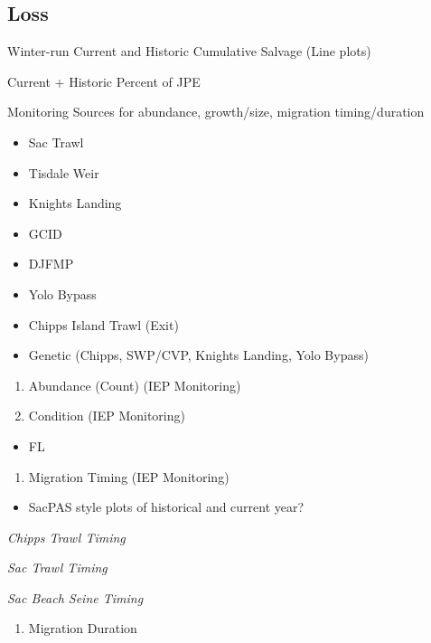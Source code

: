 \documentclass[
]{book}
\providecommand{\tightlist}{%
  \setlength{\itemsep}{0pt}\setlength{\parskip}{0pt}}
\theoremstyle{definition}
\theoremstyle{definition}
\theoremstyle{definition}
\theoremstyle{definition}
\theoremstyle{remark}
\begin{document}
\hypertarget{loss}{%
\subsection{Loss}\label{loss}}

Winter-run Current and Historic Cumulative Salvage (Line plots)

Current + Historic Percent of JPE

Monitoring Sources for abundance, growth/size, migration timing/duration

\begin{itemize}
\tightlist
\item
  Sac Trawl
\item
  Tisdale Weir
\item
  Knights Landing
\item
  GCID
\item
  DJFMP
\item
  Yolo Bypass
\item
  Chipps Island Trawl (Exit)
\item
  Genetic (Chipps, SWP/CVP, Knights Landing, Yolo Bypass)
\end{itemize}

\begin{enumerate}
\def\labelenumi{\arabic{enumi}.}
\item
  Abundance (Count) (IEP Monitoring)
\item
  Condition (IEP Monitoring)
\end{enumerate}

\begin{itemize}
\tightlist
\item
  FL
\end{itemize}

\begin{enumerate}
\def\labelenumi{\arabic{enumi}.}
\setcounter{enumi}{2}
\tightlist
\item
  Migration Timing (IEP Monitoring)
\end{enumerate}

\begin{itemize}
\tightlist
\item
  SacPAS style plots of historical and current year?
\end{itemize}

\emph{Chipps Trawl Timing}

\emph{Sac Trawl Timing}

\emph{Sac Beach Seine Timing}

\begin{enumerate}
\def\labelenumi{\arabic{enumi}.}
\setcounter{enumi}{3}
\tightlist
\item
  Migration Duration
\end{enumerate}
\end{document}
